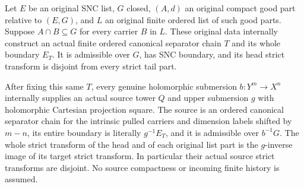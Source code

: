 \begin{theorem}
\label{hir:original-canonical-ordered-separator-producer}
\leanok
Let $E$ be an original SNC list, $G$ closed, $(A,d)$ an original
compact good part relative to $(E,G)$, and $L$ an original finite
ordered list of such good parts. Suppose $A\cap B\subseteq G$ for
every carrier $B$ in $L$. These original data internally construct an
actual finite ordered canonical separator chain $T$ and its whole
boundary $E_T$. It is admissible over $G$, has SNC boundary, and its
head strict transform is disjoint from every strict tail part.

After fixing this same $T$, every genuine holomorphic submersion
$b:Y^m\to X^n$ internally supplies an actual source tower $Q$ and
upper submersion $g$ with holomorphic Cartesian projection square.
The source is an ordered canonical separator chain for the intrinsic
pulled carriers and dimension labels shifted by $m-n$, its entire
boundary is literally $g^{-1}E_T$, and it is admissible over $b^{-1}G$.
The whole strict transform of the head and of each original list
part is the $g$-inverse image of its target strict transform. In
particular their actual source strict transforms are disjoint.
No source compactness or incoming finite history is assumed.
\end{theorem}

